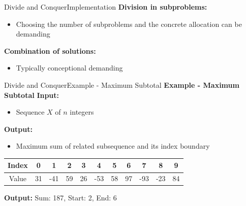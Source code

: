 
\begin{frame}{Divide and Conquer}{Implementation}
  \textbf{Division in subproblems:}
  \begin{itemize}
    \item<2->
      Choosing the number of subproblems and the concrete allocation can be
      demanding
  \end{itemize}
  \vspace{1em}
  \textbf{Combination of solutions:}
  \begin{itemize}
    \item<4->
      Typically conceptional demanding
  \end{itemize}
\end{frame}


\begin{frame}{Divide and Conquer}{Example - Maximum Subtotal}
  \textbf{Example - Maximum Subtotal}
   \textbf{Input:}
  \begin{itemize}
    \item<4->
      Sequence {\color{MainA}$X$} of {\color{MainA}$n$} integers
  \end{itemize}
  \textbf{Output:}
  \begin{itemize}
    \item<6->
      Maximum sum of related subsequence and its index boundary
  \end{itemize}
    \vspace{1em}
    \begin{table}[!t]
      \begin{tabular}{c|c|c|c|c|c|c|c|c|c|c}
        Index & 0 & 1 & 2 & 3 & 4 & 5 & 6 & 7 & 8 & 9\\
        \midrule
        Value & 31 & -41 & 59 & 26 & -53 & 58 & 97 & -93 & -23 & 84
      \end{tabular}
      \end{table}
  \textbf{Output:} Sum: 187, Start: 2, End: 6
\end{frame}


